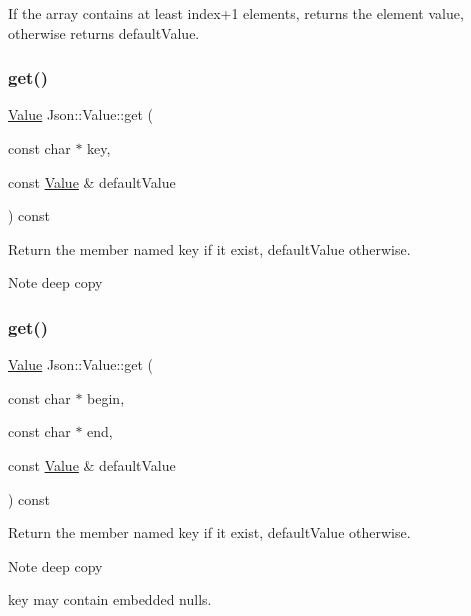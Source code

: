 If the array contains at least index+1 elements, returns the element value, otherwise returns default\+Value. \hypertarget{class_json_1_1_value_a57de86629ed23246f14014fb6c44fa67}{}\label{class_json_1_1_value_a57de86629ed23246f14014fb6c44fa67} 
\subsubsection{\texorpdfstring{get()}{get()}\hspace{0.1cm}{\footnotesize\ttfamily [2/8]}}
{\footnotesize\ttfamily \hyperlink{class_json_1_1_value}{Value} Json\+::\+Value\+::get (\begin{DoxyParamCaption}\item[{const char $\ast$}]{key,  }\item[{const \hyperlink{class_json_1_1_value}{Value} \&}]{default\+Value }\end{DoxyParamCaption}) const}

Return the member named key if it exist, default\+Value otherwise. \begin{DoxyNote}{Note}
deep copy 
\end{DoxyNote}
\hypertarget{class_json_1_1_value_aa59ed050e87e1d58d93671a38687f36c}{}\label{class_json_1_1_value_aa59ed050e87e1d58d93671a38687f36c} 
\subsubsection{\texorpdfstring{get()}{get()}\hspace{0.1cm}{\footnotesize\ttfamily [3/8]}}
{\footnotesize\ttfamily \hyperlink{class_json_1_1_value}{Value} Json\+::\+Value\+::get (\begin{DoxyParamCaption}\item[{const char $\ast$}]{begin,  }\item[{const char $\ast$}]{end,  }\item[{const \hyperlink{class_json_1_1_value}{Value} \&}]{default\+Value }\end{DoxyParamCaption}) const}

Return the member named key if it exist, default\+Value otherwise. \begin{DoxyNote}{Note}
deep copy 

key may contain embedded nulls. 
\end{DoxyNote}
\hypertarget{class_json_1_1_value_a7406e6af727c288bf8ab59945ece686a}{}\label{class_json_1_1_value_a7406e6af727c288bf8ab59945ece686a} 
